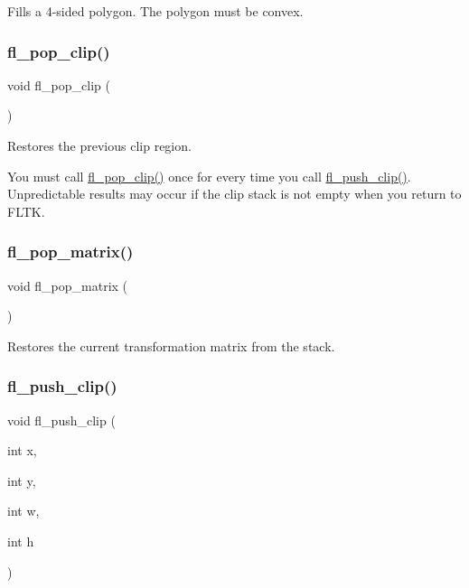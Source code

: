 Fills a 4-\/sided polygon. The polygon must be convex. \mbox{\label{group__fl__drawings_ga7abb216a9a87408c8926126cc9efce22}} 
\subsubsection{\texorpdfstring{fl\+\_\+pop\+\_\+clip()}{fl\_pop\_clip()}}
{\footnotesize\ttfamily void fl\+\_\+pop\+\_\+clip (\begin{DoxyParamCaption}{ }\end{DoxyParamCaption})\hspace{0.3cm}{\ttfamily [inline]}}

Restores the previous clip region.

You must call \hyperlink{group__fl__drawings_ga7abb216a9a87408c8926126cc9efce22}{fl\+\_\+pop\+\_\+clip()} once for every time you call \hyperlink{group__fl__drawings_gabe60242ba3b975800717b95cb6bc06d2}{fl\+\_\+push\+\_\+clip()}. Unpredictable results may occur if the clip stack is not empty when you return to F\+L\+TK. \mbox{\label{group__fl__drawings_gab002201c2d4dfd87f82c3bd039d92ecc}} 
\subsubsection{\texorpdfstring{fl\+\_\+pop\+\_\+matrix()}{fl\_pop\_matrix()}}
{\footnotesize\ttfamily void fl\+\_\+pop\+\_\+matrix (\begin{DoxyParamCaption}{ }\end{DoxyParamCaption})\hspace{0.3cm}{\ttfamily [inline]}}

Restores the current transformation matrix from the stack. \mbox{\label{group__fl__drawings_gabe60242ba3b975800717b95cb6bc06d2}} 
\subsubsection{\texorpdfstring{fl\+\_\+push\+\_\+clip()}{fl\_push\_clip()}}
{\footnotesize\ttfamily void fl\+\_\+push\+\_\+clip (\begin{DoxyParamCaption}\item[{int}]{x,  }\item[{int}]{y,  }\item[{int}]{w,  }\item[{int}]{h }\end{DoxyParamCaption})\hspace{0.3cm}{\ttfamily [inline]}}


